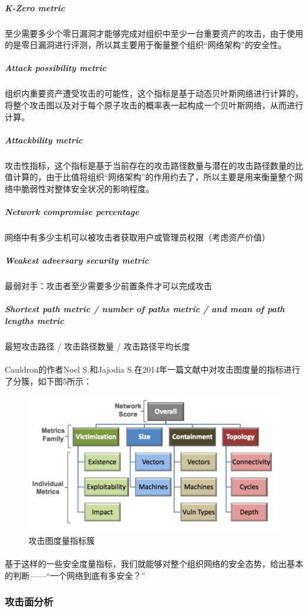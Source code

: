 \documentclass[12pt,a4paper]{article}
\begin{document}
\subparagraph{K-Zero metric} 至少需要多少个零日漏洞才能够完成对组织中至少一台重要资产的攻击，由于使用的是零日漏洞进行评测，所以其主要用于衡量整个组织“网络架构”的安全性。
\subparagraph{Attack possibility metric} 组织内重要资产遭受攻击的可能性，这个指标是基于动态贝叶斯网络进行计算的， 将整个攻击图以及对于每个原子攻击的概率表一起构成一个贝叶斯网络，从而进行计算。
\subparagraph{Attackbility metric} 攻击性指标，这个指标是基于当前存在的攻击路径数量与潜在的攻击路径数量的比值计算的，由于比值将组织“网络架构”的作用约去了，所以主要是用来衡量整个网络中脆弱性对整体安全状况的影响程度。
\subparagraph{Network compromise percentage\cite{27}}网络中有多少主机可以被攻击者获取用户或管理员权限（考虑资产价值）
\subparagraph{Weakest adversary security metric\cite{28}}最弱对手：攻击者至少需要多少前置条件才可以完成攻击
\subparagraph{Shortest path metric / number of paths metric / and mean of path lengths metric\cite{29}} 最短攻击路径 / 攻击路径数量 / 攻击路径平均长度

\paragraph{}
Cauldron的作者Noel S.和Jajodia S.在2014年一篇文献中对攻击图度量的指标进行了分簇，如下图5所示：
\begin{figure}[!htp]
	\centering
	\includegraphics[scale=0.40]{images/metrics.png} 
	\caption{攻击图度量指标簇}
\end{figure}

\paragraph{}
基于这样的一些安全度量指标，我们就能够对整个组织网络的安全态势，给出基本的判断——“一个网络到底有多安全？”

\subsubsection{攻击面分析}
\end{document}
